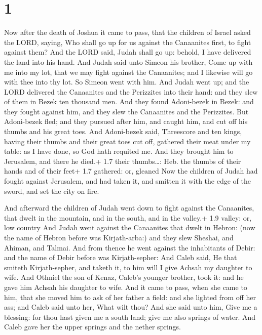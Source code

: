 \hypertarget{section}{%
\section{1}\label{section}}

 Now after the death of Joshua it came to pass, that the
children of Israel asked the LORD, saying, Who shall go up for us
against the Canaanites first, to fight against them?  And
the LORD said, Judah shall go up: behold, I have delivered the land into
his hand.  And Judah said unto Simeon his brother, Come up
with me into my lot, that we may fight against the Canaanites; and I
likewise will go with thee into thy lot. So Simeon went with him.
 And Judah went up; and the LORD delivered the Canaanites
and the Perizzites into their hand: and they slew of them in Bezek ten
thousand men.  And they found Adoni-bezek in Bezek: and they
fought against him, and they slew the Canaanites and the Perizzites.
 But Adoni-bezek fled; and they pursued after him, and
caught him, and cut off his thumbs and his great toes.  And
Adoni-bezek said, Threescore and ten kings, having their thumbs and
their great toes cut off, gathered their meat under my table: as I have
done, so God hath requited me. And they brought him to Jerusalem, and
there he died.+ 1.7 their thumbs\ldots: Heb. the thumbs of their hands
and of their feet+ 1.7 gathered: or, gleaned  Now the
children of Judah had fought against Jerusalem, and had taken it, and
smitten it with the edge of the sword, and set the city on fire.

 And afterward the children of Judah went down to fight
against the Canaanites, that dwelt in the mountain, and in the south,
and in the valley.+ 1.9 valley: or, low country  And Judah
went against the Canaanites that dwelt in Hebron: (now the name of
Hebron before was Kirjath-arba:) and they slew Sheshai, and Ahiman, and
Talmai.  And from thence he went against the inhabitants of
Debir: and the name of Debir before was Kirjath-sepher: 
And Caleb said, He that smiteth Kirjath-sepher, and taketh it, to him
will I give Achsah my daughter to wife.  And Othniel the
son of Kenaz, Caleb's younger brother, took it: and he gave him Achsah
his daughter to wife.  And it came to pass, when she came
to him, that she moved him to ask of her father a field: and she lighted
from off her ass; and Caleb said unto her, What wilt thou? 
And she said unto him, Give me a blessing: for thou hast given me a
south land; give me also springs of water. And Caleb gave her the upper
springs and the nether springs.

